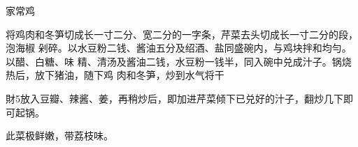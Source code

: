 \begin{recipe}{家常鸡}

\ingredients


\cooking

将鸡肉和冬笋切成长一寸二分、宽二分的一字条，芹菜去头切成长一寸二分的段，泡海椒
剁碎。以水豆粉二钱、酱油五分及绍酒、盐同盛碗内，与鸡块拌和均勻。以醋、白糖、味
精、清汤及酱油二钱，水豆粉一钱半，同入碗中兑成汁子。锅烧热后，放下猪油，随下鸡
肉和冬笋，炒到水气将干

財5放入豆瓣、辣酱、姜，再稍炒后，即加进芹菜倾下已兑好的汁子，翻炒几下即可起锅。

\notes

此菜极鲜嫩，带荔枝味。

\end{recipe}

